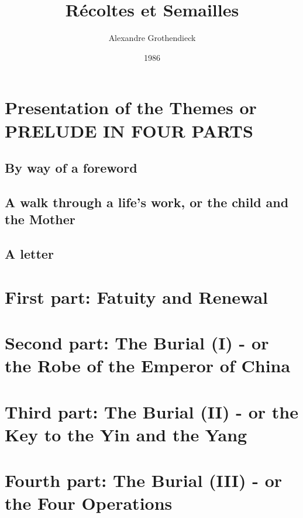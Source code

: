 \documentclass{book}
\begin{document}
\title{R\'ecoltes et Semailles}
\author{Alexandre Grothendieck}
\date{1986}
\maketitle
\tableofcontents

\part*{Presentation of the Themes or PRELUDE IN FOUR PARTS}

\chapter{By way of a foreword}


\chapter{A walk through a life's work, or the child and the Mother}


\chapter{A letter}


\part{First part: Fatuity and Renewal}
\label{part:I}

\part{Second part: The Burial (I) - or the Robe of the Emperor of China}
\label{part:II}





\part{Third part: The Burial (II) - or the Key to the Yin and the Yang}
\label{part:III}


\part{Fourth part: The Burial (III) - or the Four Operations}
\label{part:IV}
\end{document}
